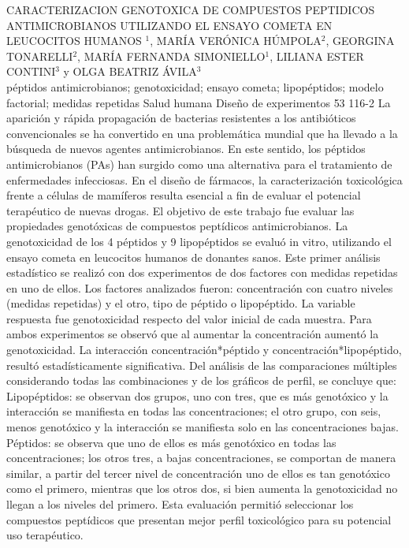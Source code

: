 \A
{CARACTERIZACION GENOTOXICA DE COMPUESTOS PEPTIDICOS ANTIMICROBIANOS UTILIZANDO EL ENSAYO COMETA EN LEUCOCITOS HUMANOS}
{$^1$, MARÍA VERÓNICA HÚMPOLA$^2$, GEORGINA TONARELLI$^2$, MARÍA FERNANDA SIMONIELLO$^1$, LILIANA ESTER CONTINI$^3$ y OLGA BEATRIZ ÁVILA$^3$}
{
\\}
{péptidos antimicrobianos; genotoxicidad; ensayo cometa; lipopéptidos; modelo factorial; medidas repetidas} 
 {Salud humana} 
 {Diseño de experimentos} 
 {53} 
 {116-2}
{La aparición y rápida propagación de bacterias resistentes a los antibióticos convencionales se ha convertido en una problemática mundial que ha llevado a la búsqueda de nuevos agentes antimicrobianos. En este sentido, los péptidos antimicrobianos (PAs) han surgido como una alternativa para el tratamiento de enfermedades infecciosas. En el diseño de fármacos, la caracterización toxicológica frente a células de mamíferos resulta esencial a fin de evaluar el potencial terapéutico de nuevas drogas. El objetivo de este trabajo fue evaluar las propiedades genotóxicas de compuestos peptídicos antimicrobianos. La genotoxicidad de los 4 péptidos y 9 lipopéptidos se evaluó in vitro, utilizando el ensayo cometa en leucocitos humanos de donantes sanos. Este primer análisis estadístico se realizó con dos experimentos de dos factores con medidas repetidas en uno de ellos. Los factores analizados fueron: concentración con cuatro niveles (medidas repetidas) y el otro, tipo de péptido o lipopéptido. La variable respuesta fue genotoxicidad respecto del valor inicial de cada muestra. Para ambos experimentos se observó que al aumentar la concentración aumentó la genotoxicidad. La interacción concentración*péptido y concentración*lipopéptido, resultó estadísticamente significativa. Del análisis de las comparaciones múltiples considerando todas las combinaciones y de los gráficos de perfil, se concluye que: Lipopéptidos: se observan dos grupos, uno con tres, que es más genotóxico y la interacción se manifiesta en todas las concentraciones; el otro grupo, con seis, menos genotóxico y la interacción se manifiesta solo en las concentraciones bajas. Péptidos: se observa que uno de ellos es más genotóxico en todas las concentraciones; los otros tres, a bajas concentraciones, se comportan de manera similar, a partir del tercer nivel de concentración uno de ellos es tan genotóxico como el primero, mientras que los otros dos, si bien aumenta la genotoxicidad no llegan a los niveles del primero. Esta evaluación permitió seleccionar los compuestos peptídicos que presentan mejor perfil toxicológico para su potencial uso terapéutico. }
